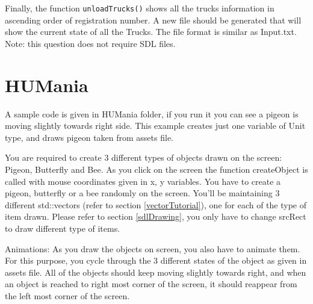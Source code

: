 \documentclass[a4paper,12pt]{article}
\begin{document}
	\noindent Finally, the function \texttt{unloadTrucks()} shows all the trucks information in ascending order of registration number. A new file  should be generated that will show the current state of all the Trucks. The file format is similar as Input.txt.\smallskip\\	

	Note: this question does not require SDL files.
	
	\section{HUMania}
	
A sample code is given in HUMania folder, if you run it you can see a pigeon is moving slightly towards right side. This example creates just one variable of  Unit type, and draws pigeon taken from assets file. 
	
You are required to create 3 different types of objects drawn on the screen: Pigeon, Butterfly and Bee. As you click on the screen the function createObject is called with mouse coordinates given in x, y variables. You have to create a pigeon, butterfly or a bee randomly on the screen. You'll be maintaining 3 different std::vectors (refer to section \ref{vectorTutorial}), one for each of the type of item drawn. Please refer to section \ref{sdlDrawing}, you only have to change srcRect to draw different type of items. 

Animations: As you draw the objects on screen, you also have to animate them. For this purpose, you cycle through the 3 different states of the object as given in assets file. 
All of the objects should keep moving slightly towards right, and when an object is reached to right most corner of the screen, it should reappear from the left most corner of the screen. 

%	 	
%	 	
 
\end{document}
